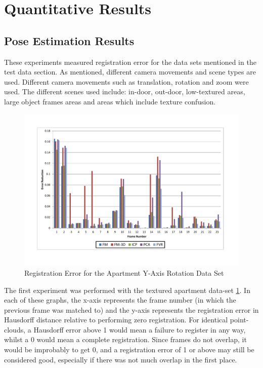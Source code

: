 \section{Quantitative Results}

\subsection{Pose Estimation Results}

These experiments measured registration error for the data sets mentioned in the test data section. As mentioned, different camera movements and scene types are used. Different camera movements such as translation, rotation and zoom were used. The different scenes used include: in-door, out-door, low-textured areas, large object frames areas and areas which include texture confusion. \\


\begin{figure}[t]
\centering
\includegraphics[width=6.0in]{images/results/Apartment_Texture_Rotate}
\caption{Registration Error for the Apartment Y-Axis Rotation Data Set}
\label{fig:PET0}
\end{figure}

The first experiment was performed with the textured apartment data-set \ref{fig:PET0}. In each of these graphs, the x-axis represents the frame number (in which the previous frame was matched to) and the y-axis represents the registration error in Hausdorff distance relative to performing zero registration. For identical point-clouds, a Hausdorff error above 1 would mean a failure to register in any way, whilst a 0 would mean a complete registration. Since frames do not overlap, it would be improbably to get 0, and a registration error of 1 or above may still be considered good, especially if there was not much overlap in the first place. \\


